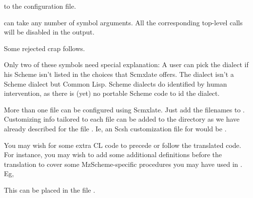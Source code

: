 
\n to the configuration file.

 can take any number of symbol
arguments.  All the corresponding top-level calls
will be disabled in the output.

\bye

Some rejected crap follows.

Only two of these symbols need special explanation: A
user can pick the  dialect if his Scheme isn't
listed in the choices that Scmxlate offers.  The
dialect  isn't a Scheme dialect but Common Lisp.
Scheme dialects do identified  by human
intervention, as there is (yet) no portable Scheme code
to id the dialect.

More than one file can be configured using
Scmxlate.  Just add the filenames to
.  Customizing info
tailored to each file can be added to the 
directory as we have already described for the
file .  Ie, an Scsh customization file
for  would be
.

\iffalse
This kind of definition replacement is particularly
useful when the target language is Common Lisp.
For instance, let's say \p{progfile} contains
the definition

\q{
(define lassoc
  (lambda (k al equ?)
    (let loop ((al al))
      (if (null? al) #f
          (let ((c (car al)))
            (if (equ? (car c) k) c
                (loop (cdr al))))))))
}

Scmxlate will provide a complicated if working
Common Lisp translation of the above code, but it
will not be as simple as

\q{
(defun lassoc (k al equ?)
  (assoc k al :test equ?))
}

You can put this latter definition in
\p{dialects/cl-progfile} -- where the symbol \q{cl}
stands for Common Lisp -- and it will be used in
preference to the default translation.
\fi

You may wish for some extra CL code to precede or
follow the translated  code.  For instance,
you may wish to add some additional definitions before
the translation to cover some MzScheme-specific
procedures you may have used in .  Eg,


\n This can be placed in the file
.

